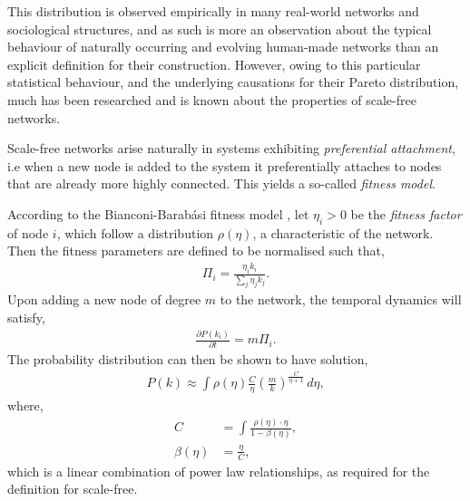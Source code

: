 This distribution is observed empirically in many real-world networks and sociological structures, and as such is more an observation about the typical behaviour of naturally occurring and evolving human-made networks than an explicit definition for their construction. However, owing to this particular statistical behaviour, and the underlying causations for their Pareto distribution, much has been researched and is known about the properties of scale-free networks.

Scale-free networks arise naturally in systems exhibiting \textit{preferential attachment}, i.e when a new node is added to the system it preferentially attaches to nodes that are already more highly connected. This yields a so-called \textit{fitness model}.

According to the Bianconi-Barab{\'a}si fitness model \cite{bib:BBfitness, bib:BAfitness}, let \mbox{$\eta_i>0$} be the \textit{fitness factor} of node $i$, which follow a distribution $\rho(\eta)$, a characteristic of the network. Then the fitness parameters are defined to be normalised such that,
\begin{align}
\Pi_i = \frac{\eta_i k_i}{\sum_j \eta_j k_j}.	
\end{align}
Upon adding a new node of degree $m$ to the network, the temporal dynamics will satisfy,
\begin{align}
\frac{\partial P(k_i)}{\partial t}= m\Pi_i.	
\end{align}
The probability distribution can then be shown to have solution,
\begin{align}
P(k) \approx \int \rho(\eta)\frac{C}{\eta}\left(\frac{m}{k}\right)^\frac{C}{\eta+1}\,d\eta,
\end{align}
where,
\begin{align}
	C &= \int \frac{\rho(\eta)\cdot\eta}{1-\beta(\eta)},\nonumber\\
	\beta(\eta) &= \frac{\eta}{C},
\end{align}
which is a linear combination of power law relationships, as required for the definition for scale-free.

